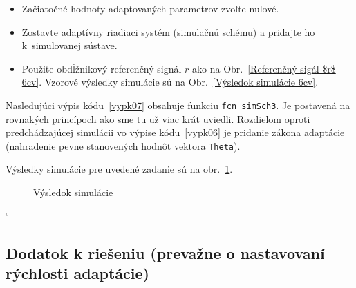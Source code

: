 \documentclass[a4paper, 10pt, ]{article}
\begin{document}
{\color{gray}

\begin{itemize}[leftmargin=0pt, labelsep=4mm, itemsep=0pt]
    \item Začiatočné hodnoty adaptovaných parametrov zvoľte nulové.
    \item Zostavte adaptívny riadiaci systém (simulačnú schému) a pridajte ho k~simulovanej sústave.
    \item Použite obdĺžnikový referenčný signál $r$ ako na Obr.~\ref{Referenčný sigál $r$ 6cv}. Vzorové výsledky simulácie sú na Obr.~\ref{Výsledok simulácie 6cv}.
\end{itemize}

}

\smallskip










\noindent
Nasledujúci výpis kódu~\ref{vypk07} obsahuje funkciu \lstinline|fcn_simSch3|. Je postavená na rovnakých princípoch ako sme tu už viac krát uviedli. Rozdielom oproti predchádzajúcej simulácii vo výpise kódu~\ref{vypk06} je pridanie zákona adaptácie (nahradenie pevne stanovených hodnôt vektora \lstinline|Theta|).

Výsledky simulácie pre uvedené zadanie sú na obr.~\ref{figsc_ar06_MRAC_1}.


\begin{figure}[t]
	\centering


    \vspace{-2mm}

	\caption{Výsledok simulácie}
	\label{figsc_ar06_MRAC_1}


    \vspace{-2mm}

\end{figure}






{\catcode`

}






\subsection{Dodatok k riešeniu (prevažne o nastavovaní rýchlosti adaptácie)}
\end{document}
